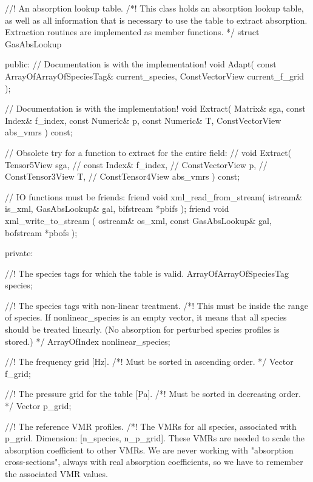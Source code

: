 \begin{code}
//! An absorption lookup table.
/*! This class holds an absorption lookup table, as well as all
    information that is necessary to use the table to extract
    absorption. Extraction routines are implemented as member
    functions. */
struct GasAbsLookup {
public:
  // Documentation is with the implementation!
  void Adapt( const ArrayOfArrayOfSpeciesTag& current_species,
              ConstVectorView current_f_grid );

  // Documentation is with the implementation!
  void Extract( Matrix&         sga,
                            const Index&    f_index,
                            const Numeric&  p,
                            const Numeric&  T,
                ConstVectorView abs\_vmrs ) const;

    // Obsolete try for a function to extract for the entire field:
    //   void Extract( Tensor5View      sga,
    //                 const Index&     f_index,
    //                 ConstVectorView  p,
    //                 ConstTensor3View T,
    //                 ConstTensor4View abs\_vmrs ) const;

  // IO functions must be friends:
  friend void xml_read_from_stream( istream& is_xml,
                                    GasAbsLookup& gal,
                                    bifstream *pbifs );
  friend void xml_write_to_stream ( ostream& os_xml,
                                    const GasAbsLookup& gal,
                                    bofstream *pbofs );


private:

  //! The species tags for which the table is valid.
  ArrayOfArrayOfSpeciesTag species; 

  //! The species tags with non-linear treatment.
  /*! This must be inside the range of species. If nonlinear_species
    is an empty vector, it means that all species should be treated
    linearly. (No absorption for perturbed species profiles is 
    stored.) */
  ArrayOfIndex nonlinear_species; 

  //! The frequency grid [Hz].
  /*! Must be sorted in ascending order. */
  Vector    f_grid;

  //! The pressure grid for the table [Pa].
  /*! Must be sorted in decreasing order. */
  Vector    p_grid;  

  //! The reference VMR profiles.
  /*! The VMRs for all species, associated with p_grid. Dimension:
    [n_species, n_p_grid]. These VMRs are needed to scale the
    absorption coefficient to other VMRs. We are never working with
    "absorption cross-sections", always with real absorption 
    coefficients, so we have to remember the associated VMR values. 

}
\end{code}
